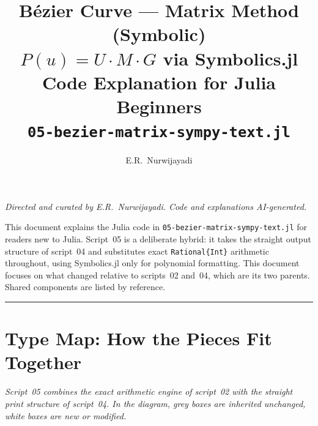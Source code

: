 \documentclass[12pt, a4paper]{article}
\title{%
  \vspace{1cm}
  {\LARGE\bfseries B\'ezier Curve --- Matrix Method (Symbolic)}\\[0.4em]
  {\large $P(u) = U \cdot M \cdot G$ \quad via Symbolics.jl}\\[0.4em]
  {\large Code Explanation for Julia Beginners}\\[0.4em]
  {\normalsize\texttt{05-bezier-matrix-sympy-text.jl}}
}
\author{E.R.\ Nurwijayadi}
\date{\DTMtoday}
\newcommand{\cd}[1]{\texttt{#1}}
\begin{document}

\maketitle
\thispagestyle{empty}

\begin{center}
\textit{Directed and curated by E.R.\ Nurwijayadi.
Code and explanations AI-generated.}
\end{center}

\begin{center}
\begin{minipage}{0.85\textwidth}
\small
This document explains the Julia code in
\cd{05-bezier-matrix-sympy-text.jl} for readers new to Julia.
Script~05 is a deliberate hybrid: it takes the straight
output structure of script~04 and substitutes exact
\cd{Rational\{Int\}} arithmetic throughout, using
Symbolics.jl only for polynomial formatting.
This document focuses on what changed relative to
scripts~02 and~04, which are its two parents.
Shared components are listed by reference.
\end{minipage}
\end{center}

\vspace{1em}\hrule\vspace{1.5em}
\tableofcontents
\newpage


\section{Type Map: How the Pieces Fit Together}

\textit{Script~05 combines the exact arithmetic engine of
script~02 with the straight print structure of script~04.
In the diagram, grey boxes are inherited unchanged,
white boxes are new or modified.}

\bigskip
\end{document}
